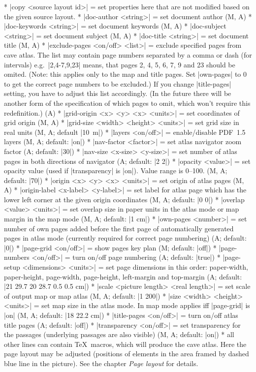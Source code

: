\comopt 
  * |copy <source layout id>| = set properties here that are not
    modified based on the given source layout.
  * |doc-author <string>| = set document author (M, A)
  * |doc-keywords <string>| = set document keywords (M, A)
  * |doc-subject <string>| = set document subject (M, A)
  * |doc-title <string>| = set document title (M, A)
  * |exclude-pages <on/off> <list>| = exclude specified pages from cave
    atlas. The list may contain page numbers separated by a comma or dash (for intervals) 
    e.g.~|2,4-7,9,23| means, that pages 2, 4, 5, 6, 7, 9 and 23 should be 
    omited. (Note: this applies only to the map and title pages. Set 
    |own-pages| to 0 to get the correct page numbers to be excluded.) 
    If you change |title-pages| setting, you have to
    adjust this list accordingly. (In the future there will be another form
    of the specification of which pages to omit, which won't require
    this redefinition.) (A)
  * |grid-origin <x> <y> <x> <units>| = set coordinates of grid
    origin (M, A)
  * |grid-size <width> <height> <units>| = set grid size in real
    units (M, A; default \hbox{|10 m|})
  * |layers <on/off>| = enable/disable PDF~1.5 layers (M, A; default: |on|)
  * |nav-factor <factor>| = set atlas navigator zoom factor (A; default: |30|)
  * |nav-size <x-size> <y-size>| = set number of atlas pages in 
    both directions of navigator (A; default: |2 2|)
  * |opacity <value>| = set opacity value (used if |transparency| is |on|). 
    Value range is 0--100. (M, A; default: |70|)
  * |origin <x> <y> <x> <units>| = set origin of atlas pages (M, A)
  * |origin-label <x-label> <y-label>| = set label for atlas page
    which has the lower left corner at the given origin coordinates
    (M, A; default: |0 0|)
  * |overlap <value> <units>| = set overlap size in paper units in the atlas 
    mode or map margin in the map mode (M, A; default: |1 cm|)
  * |own-pages <number>| = set number of own pages added before 
    the first page of automatically generated pages in atlas mode
    (currently required for correct page numbering) (A; default: |0|)
  * |page-grid <on/off>| = show pages key plan (M; default: |off|)
  * |page-numbers <on/off>| = turn on/off page numbering (A; default: |true|)
  * |page-setup <dimensions> <units>| = set page dimensions in
    this order: paper-width, paper-height, page-width, page-height,
    left-margin and top-margin (A; default: |21 29.7 20 28.7 0.5 0.5 cm|)
  * |scale <picture length> <real length>| = set scale of
    output map or map atlas (M, A; default: |1 200|)
  * |size <width> <height> <units>| = set map size in the atlas mode.
    In map mode applies iff |page-grid| is |on| (M, A; default: |18 22.2 cm|)
  * |title-pages <on/off>| = turn on/off atlas title pages (A; default: |off|)
  * |transparency <on/off>| = set transparency for the passages (underlying 
    passages are also visible) (M, A; default: |on|)
  * all other lines can contain \TeX\ macros, which will produce
    the cave atlas. Here the page layout may be adjusted (positions
    of elements in the area framed by dashed blue line in the picture).
    See the chapter {\it Page layout} for details.
\endcomopt

